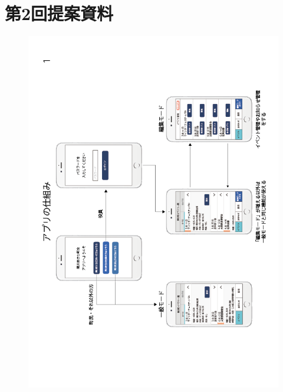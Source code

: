 \chapter{第2回提案資料}
\begin{figure}[ht]
    \begin{center}
      \includegraphics[keepaspectratio, scale=0.65]{appendixs/appendixB_figres/fig1.png}
    \end{center}
\end{figure}

